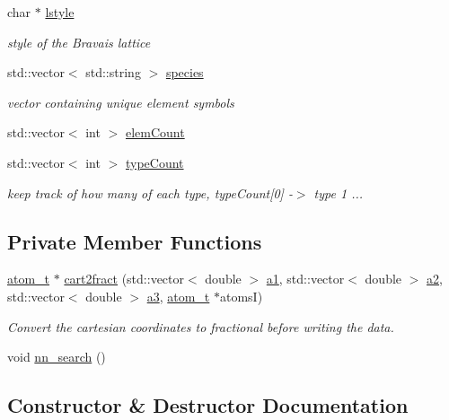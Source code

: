 \begin{DoxyCompactItemize}
char $\ast$ \hyperlink{class_l_a_t_t_i_c_e_a07635742a674cf3203f8e2c5c48118f8}{lstyle}
\begin{DoxyCompactList}\small\item\em style of the Bravais lattice \end{DoxyCompactList}\item 
std\+::vector$<$ std\+::string $>$ \hyperlink{class_l_a_t_t_i_c_e_a3737ca172950824ad0ab699802f26417}{species}
\begin{DoxyCompactList}\small\item\em vector containing unique element symbols \end{DoxyCompactList}\item 
std\+::vector$<$ int $>$ \hyperlink{class_l_a_t_t_i_c_e_a63bb555fee4e3cc086f0826437aa5af8}{elem\+Count}
\item 
std\+::vector$<$ int $>$ \hyperlink{class_l_a_t_t_i_c_e_aff3f0cdf099776c7c3dc5257e38aa52f}{type\+Count}
\begin{DoxyCompactList}\small\item\em keep track of how many of each type, {\ttfamily type\+Count\mbox{[}0\mbox{]} -\/$>$ type 1 ...} \end{DoxyCompactList}\end{DoxyCompactItemize}
\subsection*{Private Member Functions}
\begin{DoxyCompactItemize}
\item 
\hyperlink{structatom__t}{atom\+\_\+t} $\ast$ \hyperlink{class_l_a_t_t_i_c_e_ad3ac8f3bbd9f44abe61b8b7ceb62c563}{cart2fract} (std\+::vector$<$ double $>$ \hyperlink{class_l_a_t_t_i_c_e_a9a56f2f8e797ae6a496527f1ba937769}{a1}, std\+::vector$<$ double $>$ \hyperlink{class_l_a_t_t_i_c_e_a7f6dbfc6795b67a0d92b156789bb8977}{a2}, std\+::vector$<$ double $>$ \hyperlink{class_l_a_t_t_i_c_e_a5f5355169d092e243480783bde501ccd}{a3}, \hyperlink{structatom__t}{atom\+\_\+t} $\ast$atoms\+I)
\begin{DoxyCompactList}\small\item\em Convert the cartesian coordinates to fractional before writing the data. \end{DoxyCompactList}\item 
void \hyperlink{class_l_a_t_t_i_c_e_ad5df57f16ebd026cfccf59eaa5e9089f}{nn\+\_\+search} ()
\end{DoxyCompactItemize}


\subsection{Constructor \& Destructor Documentation}
\hypertarget{class_l_a_t_t_i_c_e_aabfd2a1302dd09ab010cf26414175436}{}
